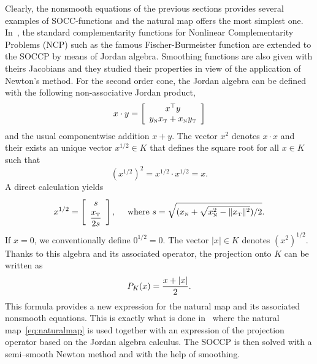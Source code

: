 Clearly, the nonsmooth equations of the previous sections provides several examples of SOCC-functions and the natural map offers the most simplest one. In~\cite{Fukushima.ea2001}, the standard complementarity functions for Nonlinear Complementarity Problems (NCP) such as the famous Fischer-Burmeister function are extended to the SOCCP by means of Jordan algebra. Smoothing functions are also given with theirs Jacobians and they studied their properties in view of the application of Newton's method.  For the second order cone, the Jordan algebra can be defined with the following non-associative Jordan product,
\begin{equation}
  \label{eq:Jordan-product}
  x \cdot y =
  \left[\begin{array}{c}
      x^\top y \\
      y_\n x_\t + x_\n y_\t
  \end{array}
\right]
\end{equation}
and the usual componentwise addition $x+y$. The vector $x^2$ denotes $x\cdot x$ and their exists an unique vector $x^{1/2}\in K$ that defines the square root for all $x \in K$ such that
\begin{equation}
  \label{eq:Jordan-sqrt}
  (x^{1/2})^2 = x^{1/2} \cdot x^{1/2} = x.
\end{equation}
A direct calculation yields
\begin{equation}
  \label{eq:Jordan-sqrt2}
  x^{1/2} =
  \left[\begin{array}{c}
    s \\[1mm]
    \Frac {x_\t} {2s}
  \end{array}\right], \quad \text{ where } s = \sqrt{(x_\n+\sqrt{x_\n^2 - \|x_\t\|^2})/2}.
\end{equation}
If $x=0$, we conventionally define $0^{1/2}=0$. The vector $|x| \in K$ denotes $(x^2)^{1/2}$. Thanks to this algebra and its associated operator, the projection onto $K$ can be written as
\begin{equation}
  \label{eq:Jordan-projection}
  P_K(x) = \Frac{x + |x|}2.
\end{equation}
This formula provides a new expression for the natural map and its associated nonsmooth equations. This is exactly what is done in~\cite{Hayashi.ea_SIOPT2005} where the natural map~\eqref{eq:naturalmap} is used together with an expression of the projection operator based on the Jordan algebra calculus. The SOCCP is then solved with a semi--smooth Newton method and with the help of smoothing.

